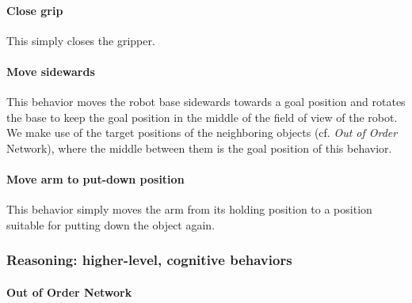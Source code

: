 \paragraph{Close grip} 
\label{grip}
This simply closes the gripper.

\paragraph{Move sidewards} 
\label{moveside}
This behavior moves the robot base sidewards towards a goal position and rotates the base to keep the goal position in the middle of the field of view of the robot. 
We make use of the target positions of the neighboring objects (cf. \emph{Out of Order} Network), where the middle between them is the goal position of this behavior.

\paragraph{Move arm to put-down position} 
\label{putdownpos}
This behavior simply moves the arm from its holding position to a position suitable for putting down the object again.

\subsubsection{Reasoning: higher-level, cognitive behaviors}%
\label{ssubsec:reasoning_higher_level_cognitive_behaviors}

\paragraph{Out of Order Network} 
\label{outoforder}

